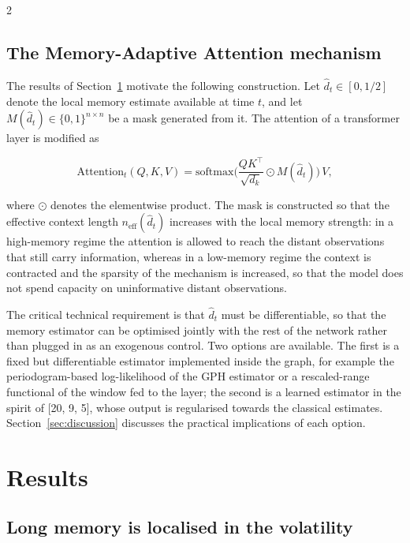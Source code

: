 \documentclass[a4paper,10pt,twoside]{article}
\begin{document}
\begin{multicols}{2}
\subsection{The Memory-Adaptive Attention mechanism}\label{sec:memadapt}

The results of Section~\ref{sec:results} motivate the following construction. Let
$\hat d_t\in[0,1/2]$ denote the local memory estimate available at time $t$, and let
$M(\hat d_t)\in\{0,1\}^{n\times n}$ be a mask generated from it. The attention of a transformer
layer is modified as

\begin{equation}\label{eq:memad}
\mathrm{Attention}_t(Q,K,V)=\mathrm{softmax}\Big(\frac{QK^{\top}}{\sqrt{d_k}}\odot M(\hat d_t)\Big)\,V,
\end{equation}

where $\odot$ denotes the elementwise product. The mask is constructed so that the effective
context length $n_{\mathrm{eff}}(\hat d_t)$ increases with the local memory strength: in a
high-memory regime the attention is allowed to reach the distant observations that still carry
information, whereas in a low-memory regime the context is contracted and the sparsity of the
mechanism is increased, so that the model does not spend capacity on uninformative distant
observations.

The critical technical requirement is that $\hat d_t$ must be differentiable, so that the memory
estimator can be optimised jointly with the rest of the network rather than plugged in as an
exogenous control. Two options are available. The first is a fixed but differentiable estimator
implemented inside the graph, for example the periodogram-based log-likelihood of the GPH estimator
or a rescaled-range functional of the window fed to the layer; the second is a learned estimator
in the spirit of [20, 9, 5], whose
output is regularised towards the classical estimates. Section~\ref{sec:discussion} discusses the
practical implications of each option.


\section{Results}\label{sec:results}

\subsection{Long memory is localised in the volatility}


\end{multicols}
\end{document}
